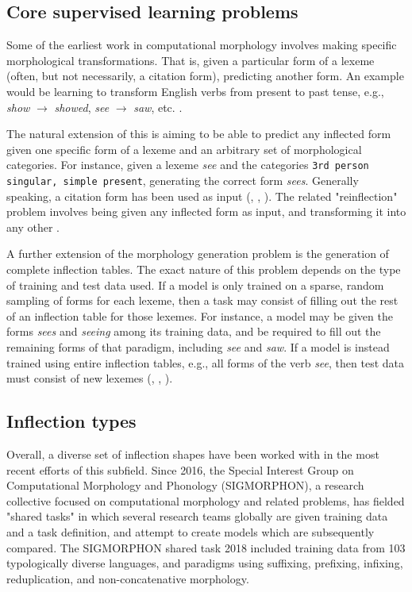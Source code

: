 \subsection{Core supervised learning problems}

Some of the earliest work in computational morphology involves making specific morphological transformations. That is, given a particular form of a lexeme (often, but not necessarily, a citation form), predicting another form. An example would be learning to transform English verbs from present to past tense, e.g., \textit{show} $\rightarrow$ \textit{showed}, \textit{see} $\rightarrow$ \textit{saw}, etc. \parencite{Dreyer2008}.

The natural extension of this is aiming to be able to predict any inflected form given one specific form of a lexeme and an arbitrary set of morphological categories. For instance, given a lexeme \textit{see} and the categories \texttt{3rd person singular, simple present}, generating the correct form \textit{sees}. Generally speaking, a citation form has been used as input (\cite{Durrett2013}, \cite{Faruqui2015}, \cite{Cotterell2017a}). The related "reinflection" problem involves being given any inflected form as input, and transforming it into any other \parencite{Cotterell2016}.

A further extension of the morphology generation problem is the generation of complete inflection tables. The exact nature of this problem depends on the type of training and test data used. If a model is only trained on a sparse, random sampling of forms for each lexeme, then a task may consist of filling out the rest of an inflection table for those lexemes. For instance, a model may be given the forms \textit{sees} and \textit{seeing} among its training data, and be required to fill out the remaining forms of that paradigm, including \textit{see} and \textit{saw}. If a model is instead trained using entire inflection tables, e.g., all forms of the verb \textit{see}, then test data must consist of new lexemes (\cite{Hulden2014}, \cite{Ahlberg2015}, \cite{Cotterell2017a}).

\subsection{Inflection types}

Overall, a diverse set of inflection shapes have been worked with in the most recent efforts of this subfield. Since 2016, the Special Interest Group on Computational Morphology and Phonology (SIGMORPHON), a research collective focused on computational morphology and related problems, has fielded "shared tasks" in which several research teams globally are given training data and a task definition, and attempt to create models which are subsequently compared. The SIGMORPHON shared task 2018 included training data from 103 typologically diverse languages, and paradigms using suffixing, prefixing, infixing, reduplication, and non-concatenative morphology. 

